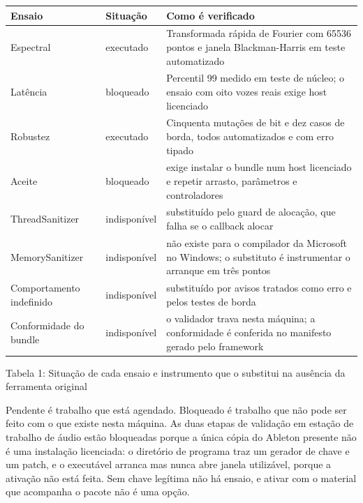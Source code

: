 \documentclass[12pt,a4paper]{article}
\begin{document}
\begin{center}
\footnotesize
\setlength{\tabcolsep}{4pt}
\begin{tabular}{p{}|p{}|p{}}
\hline
\textbf{Ensaio} & \textbf{Situação} & \textbf{Como é verificado} \\
\hline
Espectral & executado & Transformada rápida de Fourier com 65536 pontos e janela Blackman-Harris em teste automatizado \\
Latência & bloqueado & Percentil 99 medido em teste de núcleo; o ensaio com oito vozes reais exige host licenciado \\
Robustez & executado & Cinquenta mutações de bit e dez casos de borda, todos automatizados e com erro tipado \\
Aceite & bloqueado & exige instalar o bundle num host licenciado e repetir arrasto, parâmetros e controladores \\
ThreadSanitizer & indisponível & substituído pelo guard de alocação, que falha se o callback alocar \\
MemorySanitizer & indisponível & não existe para o compilador da Microsoft no Windows; o substituto é instrumentar o arranque em três pontos \\
Comportamento indefinido & indisponível & substituído por avisos tratados como erro e pelos testes de borda \\
Conformidade do bundle & indisponível & o validador trava nesta máquina; a conformidade é conferida no manifesto gerado pelo framework \\
\hline
\end{tabular}
\end{center}
\noindent Tabela 1: Situação de cada ensaio e instrumento que o substitui na ausência da ferramenta original\par
\label{tab:1}
\vspace{2pt}{\footnotesize\noindent Elaborado pelos autores (2026).\par}

Pendente é trabalho que está agendado. Bloqueado é trabalho que não pode ser feito com o que existe nesta máquina. As duas etapas de validação em estação de trabalho de áudio estão bloqueadas porque a única cópia do Ableton presente não é uma instalação licenciada: o diretório de programa traz um gerador de chave e um patch, e o executável arranca mas nunca abre janela utilizável, porque a ativação não está feita. Sem chave legítima não há ensaio, e ativar com o material que acompanha o pacote não é uma opção.
\end{document}
